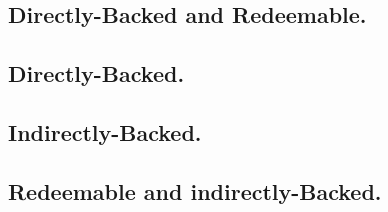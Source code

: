 \subsection{Directly-Backed and Redeemable.}


\subsection{Directly-Backed.}
%

\subsection{Indirectly-Backed.}


\subsection{Redeemable and indirectly-Backed.}



